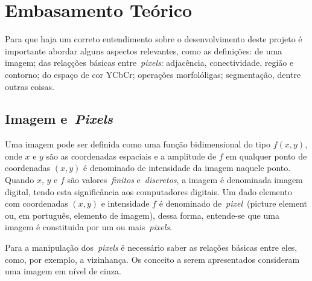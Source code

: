 \documentclass[conference]{Trabalho_Final}
\begin{document}

\section{Embasamento Te\'orico}
  \label{sec:teorico}
Para que haja um correto entendimento sobre o desenvolvimento deste projeto \'e importante abordar alguns aspectos relevantes, como as defini\c{c}\~oes: de uma imagem; das rela\c{c}\c{c}\~oes b\'asicas entre~\textit{pixels}: adjac\^encia, conectividade, regi\~ao e contorno; do espa\c{c}o de cor YCbCr; opera\c{c}\~oes morfol\'oligas; segmenta\c{c}\~ao, dentre outras coisas.

\subsection{Imagem e~\textit{Pixels}}
  \label{subsec:imagens}
Uma imagem pode ser definida como uma fun\c{c}\~ao bidimensional do tipo $f(x,y)$, onde $x$ e $y$ s\~ao as coordenadas espaciais e a amplitude de $f$ em qualquer ponto de coordenadas $(x,y)$ \'e denominado de intensidade da imagem naquele ponto. Quando $x$, $y$ e $f$ s\~ao valores~\textit{finitos} e~\textit{discretos}, a imagem \'e denominada imagem digital, tendo esta signific\^ancia aos computadores digitais. Um dado elemento com coordenadas $(x,y)$ e intensidade $f$ \'e denominado de~\textit{pixel}~(picture element ou, em portugu\^es, elemento de imagem), dessa forma, entende-se que uma imagem \'e constituida por um ou mais~\textit{pixels}.

Para a manipula\c{c}\~ao dos~\textit{pixels} \'e necess\'ario saber as rela\c{c}\~oes b\'asicas entre eles, como, por exemplo, a vizinhan\c{c}a. Os conceito a serem apresentados consideram uma imagem em n\'ivel de cinza.
\end{document}
